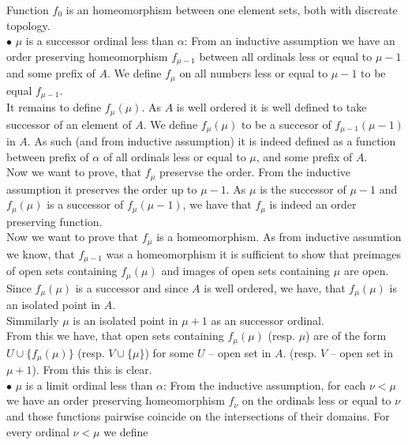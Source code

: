 Function $f_0$ is an homeomorphism between one element sets, both with discreate topology. \\
$\bullet$ $\mu$ is a successor ordinal less than $\alpha$: From an inductive assumption 
we have an order preserving homeomorphism $f_{\mu - 1}$ between all ordinals 
less or equal to $\mu - 1$ and some prefix of $A$. 
We define $f_\mu$ on all numbers less or equal to $\mu - 1$ to be equal $f_{\mu-1}$. \\
It remains to define $f_\mu(\mu)$. 
As $A$ is well ordered it is well defined to take successor of an element of $A$. 
We define $f_\mu(\mu)$ to be a succesor of $f_{\mu - 1}(\mu-1)$ in $A$. As such (and from 
inductive assumption) it is indeed defined as a function between prefix of $\alpha$ of all 
ordinals less or equal to $\mu$, and 
some prefix of $A$.
\\
Now we want to prove, that $f_\mu$ preservse the order. From the inductive assumption 
it preserves the order up to $\mu - 1$. As $\mu$ is the successor of $\mu - 1$ and 
$f_\mu(\mu)$ is a successor of $f_\mu(\mu-1)$, we have that $f_\mu$ is indeed an order preserving 
function. \\
Now we want to prove that $f_\mu$ is a homeomorphism. As from inductive assumtion we know, 
that $f_{\mu - 1}$ was a homeomorphism it is sufficient to show that preimages of open 
sets containing $f_\mu(\mu)$ and images of open sets containing $\mu$ are open. \\
Since $f_\mu(\mu)$ is a successor and since $A$ is well ordered, we have, that $f_\mu(\mu)$ 
is an isolated point in $A$. \\
Simmilarly $\mu$ is an isolated point in $\mu + 1$ as an successor ordinal. \\
From this we have, that open sets containing $f_\mu(\mu)$ (resp. $\mu$) are of the form 
$U \cup \{f_\mu(\mu)\}$ (resp. $V \cup \{\mu\}$) for some $U$ -- open set in $A$. 
(resp. $V$ -- open set in $\mu + 1$). 
From this this is clear. \\ 
$\bullet$ $\mu$ is a limit ordinal less than $\alpha$:  
From the inductive assumption, for each $\nu < \mu$ we have an order preserving homeomorphism 
$f_\nu$ on the ordinals less or equal to $\nu$ and those functions pairwise coincide 
on the intersections 
of their domains. For every ordinal $\nu < \mu$ we define 
